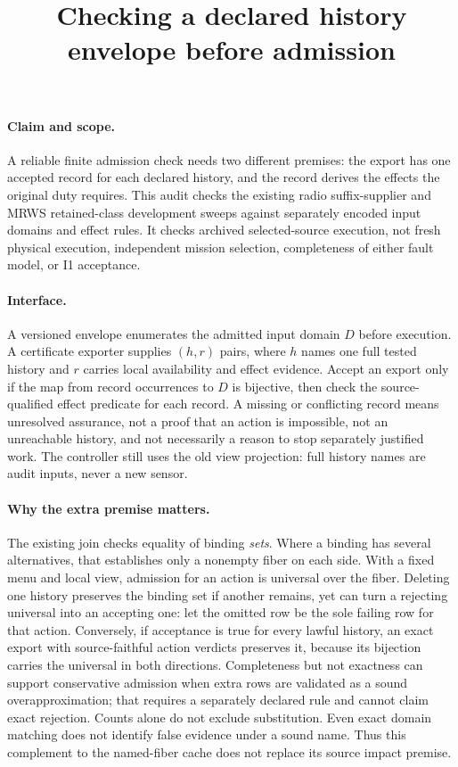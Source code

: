 \documentclass{article}
\begin{document}
\title{Checking a declared history envelope before admission}
\maketitle
\paragraph{Claim and scope.}
A reliable finite admission check needs two different premises: the export
has one accepted record for each declared history, and the record derives
the effects the original duty requires. This audit checks the existing
radio suffix-supplier and MRWS retained-class development sweeps against
separately encoded input domains and effect rules. It checks archived
selected-source execution, not fresh physical execution, independent mission
selection, completeness of either fault model, or I1 acceptance.

\paragraph{Interface.}
A versioned envelope enumerates the admitted input domain \(D\) before
execution. A certificate exporter supplies \((h,r)\) pairs, where \(h\)
names one full tested history and \(r\) carries local availability and
effect evidence. Accept an export only if the map from record occurrences
to \(D\) is bijective, then check the source-qualified effect predicate
for each record. A missing or conflicting record means unresolved
assurance, not a proof that an action is impossible, not an unreachable
history, and not necessarily a reason to stop separately justified work.
The controller still uses the old view projection: full history names
are audit inputs, never a new sensor.

\paragraph{Why the extra premise matters.}
The existing join checks equality of binding \emph{sets}. Where a binding
has several alternatives, that establishes only a nonempty fiber on
each side. With a fixed menu and local view, admission for an action is
universal over the fiber. Deleting one history preserves the binding
set if another remains, yet can turn a rejecting universal into an
accepting one: let the omitted row be the sole failing row for that
action. Conversely, if acceptance is true for every lawful history, an
exact export with source-faithful action verdicts preserves it, because
its bijection carries the universal in both directions. Completeness
but not exactness can support conservative admission when extra rows
are validated as a sound overapproximation; that requires a separately
declared rule and cannot claim exact rejection. Counts alone do not
exclude substitution. Even exact domain matching does not identify
false evidence under a sound name. Thus this complement to the
named-fiber cache does not replace its source impact premise.
\end{document}
